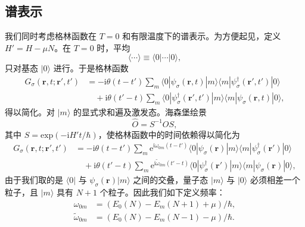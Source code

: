 \subsection*{谱表示}

我们同时考虑格林函数在 $T=0$ 和有限温度下的谱表示。为方便起见，定义 $H'=H-\mu N$。在 $T=0$ 时，平均
\begin{equation*}
\langle\cdots\rangle\equiv\langle 0|\cdots|0\rangle,\tag{7.56}
\end{equation*}
只对基态 $|0\rangle$ 进行。于是格林函数
\begin{equation*}
\begin{aligned}
G_{\sigma}(\mathbf{r},t;\mathbf{r}',t')&=-\mathrm{i}\theta(t-t')\sum_{m}\langle 0|\psi_{\sigma}(\mathbf{r},t)|m\rangle\langle m|\psi_{\sigma}^{\dagger}(\mathbf{r}',t')|0\rangle\\
&\quad+\mathrm{i}\theta(t'-t)\sum_{m}\langle 0|\psi_{\sigma}^{\dagger}(\mathbf{r}',t')|m\rangle\langle m|\psi_{\sigma}(\mathbf{r},t)|0\rangle,
\end{aligned}\tag{7.57}
\end{equation*}
得以简化。对 $|m\rangle$ 的显式求和遍及激发态。海森堡绘景
\begin{equation*}
\hat{O}=S^{-1}OS,\tag{7.58}
\end{equation*}
其中 $S=\mathrm{exp}(-\mathrm{i}H't/\hbar)$，使格林函数中的时间依赖得以简化为
\begin{equation*}
\begin{aligned}
G_{\sigma}(\mathbf{r},t;\mathbf{r}',t')&=-\mathrm{i}\theta(t-t')\sum_{m}\mathrm{e}^{\mathrm{i}\omega_{0m}(t-t')}\langle 0|\psi_{\sigma}(\mathbf{r})|m\rangle\langle m|\psi_{\sigma}^{\dagger}(\mathbf{r}')|0\rangle\\
&\quad+\mathrm{i}\theta(t'-t)\sum_{m}\mathrm{e}^{\mathrm{i}\tilde{\omega}_{0m}(t'-t)}\langle 0|\psi_{\sigma}^{\dagger}(\mathbf{r}')|m\rangle\langle m|\psi_{\sigma}(\mathbf{r})|0\rangle,
\end{aligned}\tag{7.59}
\end{equation*}
由于我们取的是 $\langle 0|$ 与 $\psi_{\sigma}(\mathbf{r})|m\rangle$ 之间的交叠，量子态 $|m\rangle$ 与 $|0\rangle$ 必须相差一个粒子，且 $|m\rangle$ 具有 $N+1$ 个粒子。因此我们如下定义频率：
\begin{equation*}
\begin{aligned}
\omega_{0m}&=(E_{0}(N)-E_{m}(N+1)+\mu)/\hbar,\\
\tilde{\omega}_{0m}&=(E_{0}(N)-E_{m}(N-1)-\mu)/\hbar.
\end{aligned}\tag{7.60}
\end{equation*}
